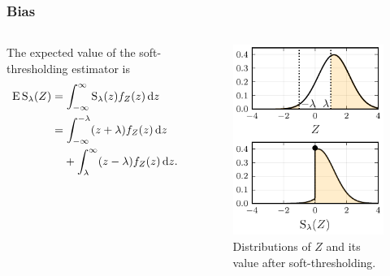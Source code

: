 \documentclass[aspectratio=1610,onlytextwidth]{beamer}
\begin{document}
\begin{frame}[c]
  \frametitle{Bias}

  \begin{columns}[T]
    \begin{column}{0.5\textwidth}
      The expected value of the soft-thresholding estimator is
      \begin{align*}
        \E \st_\lambda(Z) & = \int_{-\infty}^\infty \st_\lambda(z) f_Z(z) \du z                                                   \nonumber \\
                          & = \int_{-\infty}^{-\lambda}(z + \lambda)f_Z(z) \du z                                                            \\
                          & \phantom{={}} + \int_{\lambda}^\infty (z - \lambda)f_Z(z) \du z.
      \end{align*}

    \end{column}
    \begin{column}{0.4\textwidth}
      \begin{figure}[htpb]
        \centering
        \includegraphics[]{figures/z_normal.pdf}
        \caption{%
          Distributions of \(Z\) and its value after soft-thresholding.
        }
      \end{figure}
    \end{column}
  \end{columns}

\end{frame}
\end{document}
